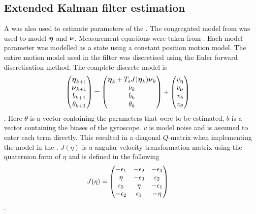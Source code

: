 \subsection{Extended Kalman filter estimation}
A \abbrEKF was also used to estimate parameters of the \abbrROV. The congregated model from  was used to model $\boldsymbol{\eta}$ and $\boldsymbol{\nu}$. Measurement equations were taken from . Each model parameter was modelled as a state using a constant position motion model. The entire motion model used in the filter was discretised using the Euler forward discretisation method. The complete discrete model is
\begin{equation}
\label{eq:motionModelKalman}
\begin{pmatrix}
\boldsymbol{\eta}_{k+1}\\ 
\boldsymbol{\nu}_{k+1}\\
b_{k+1}\\
\theta_{k+1}
\end{pmatrix} = 
\begin{pmatrix}
\boldsymbol{\eta}_k + T_s J(\boldsymbol{\eta}_k)\boldsymbol{\nu}_k\\
\nu_k\\
b_k\\
\theta_k
\end{pmatrix}
+ \begin{pmatrix}
v_{\boldsymbol{\eta}}\\
v_{\boldsymbol{\nu}}\\
v_{b}\\
v_{\theta}
\end{pmatrix}
\end{equation}.
Here $\theta$ is a vector containing the parameters that were to be estimated, $b$ is a vector containing the biases of the gyroscope. $v$ is model noise and is assumed to enter each term directly. This resulted in a diagonal $Q$-matrix when implementing the model in the \abbrEKF. $J(\eta)$ is a angular velocity transformation matrix using the quaternion form of $\eta$ and is defined in the following 
\begin{equation}
J(\eta) = \begin{pmatrix}
-\epsilon_1  & -\epsilon_2  & -\epsilon_3 \\
\eta   & -\epsilon_3 & \epsilon_2   \\
\epsilon_3 & \eta    & -\epsilon_1   \\ 
-\epsilon_2 & \epsilon_1    & -\eta   \\ 
\end{pmatrix}
\end{equation}.

